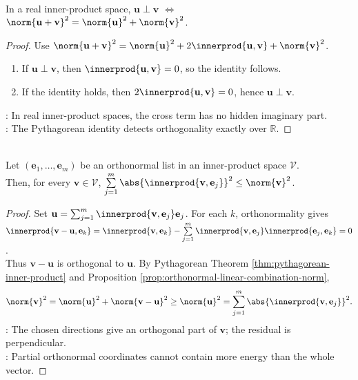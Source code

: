 \begin{proposition} \label{prop:pythagorean-converse-real-inner-products} \\
In a real inner-product space, $\mathbf{u}\perp\mathbf{v}$ $\Longleftrightarrow$ $\norm{\mathbf{u}+\mathbf{v}}^2=\norm{\mathbf{u}}^2+\norm{\mathbf{v}}^2$.
\begin{proof}
Use $\norm{\mathbf{u}+\mathbf{v}}^2 =\norm{\mathbf{u}}^2+2\innerprod{\mathbf{u},\mathbf{v}}+\norm{\mathbf{v}}^2$.
\begin{enumerate}[label=\roman*.]
\setlength{\itemsep}{0pt}
\item[$(\Rightarrow)$] If $\mathbf{u}\perp\mathbf{v}$, then $\innerprod{\mathbf{u},\mathbf{v}}=0$, so the identity follows.
\item[$(\Leftarrow)$] If the identity holds, then $2\innerprod{\mathbf{u},\mathbf{v}}=0$, hence $\mathbf{u}\perp\mathbf{v}$.
\end{enumerate}
: In real inner-product spaces, the cross term has no hidden imaginary part.\\
: The Pythagorean identity detects orthogonality exactly over $\mathbb{R}$.
\end{proof}
\end{proposition}

\begin{theorem} \label{thm:bessel-inequality-finite-orthonormal-list} \\
Let $(\mathbf{e}_1,\ldots,\mathbf{e}_m)$ be an orthonormal list in an inner-product space $\mathcal{V}$.\\
Then, for every $\mathbf{v}\in\mathcal{V}$, $\sum\limits_{j=1}^{m}\abs{\innerprod{\mathbf{v},\mathbf{e}_j}}^2\leq\norm{\mathbf{v}}^2$.
\begin{proof}
Set $\mathbf{u}=\sum_{j=1}^{m}\innerprod{\mathbf{v},\mathbf{e}_j}\mathbf{e}_j$. For each $k$, orthonormality gives $\innerprod{\mathbf{v}-\mathbf{u},\mathbf{e}_k} =\innerprod{\mathbf{v},\mathbf{e}_k} -\sum\limits_{j=1}^{m}\innerprod{\mathbf{v},\mathbf{e}_j}\innerprod{\mathbf{e}_j,\mathbf{e}_k}=0$.\\
Thus $\mathbf{v}-\mathbf{u}$ is orthogonal to $\mathbf{u}$. By Pythagorean Theorem \ref{thm:pythagorean-inner-product} and Proposition \ref{prop:orthonormal-linear-combination-norm},
\begin{align}
\norm{\mathbf{v}}^2=\norm{\mathbf{u}}^2+\norm{\mathbf{v}-\mathbf{u}}^2
\geq \norm{\mathbf{u}}^2
=\sum_{j=1}^{m}\abs{\innerprod{\mathbf{v},\mathbf{e}_j}}^2.
\nonumber
\end{align}
: The chosen directions give an orthogonal part of $\mathbf{v}$; the residual is perpendicular.\\
: Partial orthonormal coordinates cannot contain more energy than the whole vector.
\end{proof}
\end{theorem}


